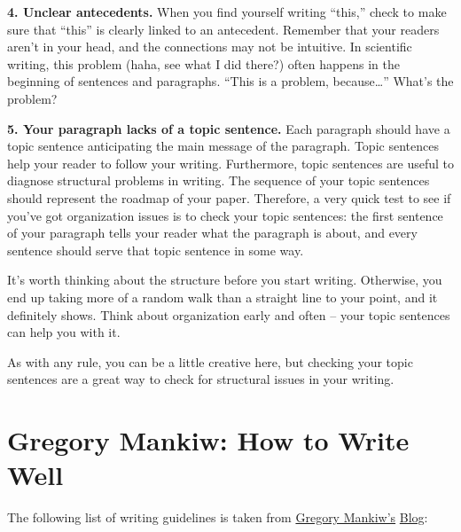 \documentclass[
]{book}
\begin{document}
\hfill\break

\textbf{4. Unclear antecedents.}
When you find yourself writing ``this,'' check to make sure that ``this'' is clearly linked to an antecedent. Remember that your readers aren't in your head, and the connections may not be intuitive. In scientific writing, this problem (haha, see what I did there?) often happens in the beginning of sentences and paragraphs. ``This is a problem, because\ldots{}'' What's the problem?

\hfill\break

\textbf{5. Your paragraph lacks of a topic sentence.}
Each paragraph should have a topic sentence anticipating the main message of the paragraph. Topic sentences help your reader to follow your writing. Furthermore, topic sentences are useful to diagnose structural problems in writing. The sequence of your topic sentences should represent the roadmap of your paper. Therefore, a very quick test to see if you've got organization issues is to check your topic sentences: the first sentence of your paragraph tells your reader what the paragraph is about, and every sentence should serve that topic sentence in some way.

It's worth thinking about the structure before you start writing. Otherwise, you end up taking more of a random walk than a straight line to your point, and it definitely shows. Think about organization early and often -- your topic sentences can help you with it.

As with any rule, you can be a little creative here, but checking your topic sentences are a great way to check for structural issues in your writing.

\hfill\break

\hypertarget{gregory-mankiw-how-to-write-well}{%
\section{Gregory Mankiw: How to Write Well}\label{gregory-mankiw-how-to-write-well}}

The following list of writing guidelines is taken from \href{https://scholar.harvard.edu/mankiw/home}{Gregory Mankiw's} \href{http://gregmankiw.blogspot.com/2006/10/how-to-write-well.html}{Blog}:
\end{document}
